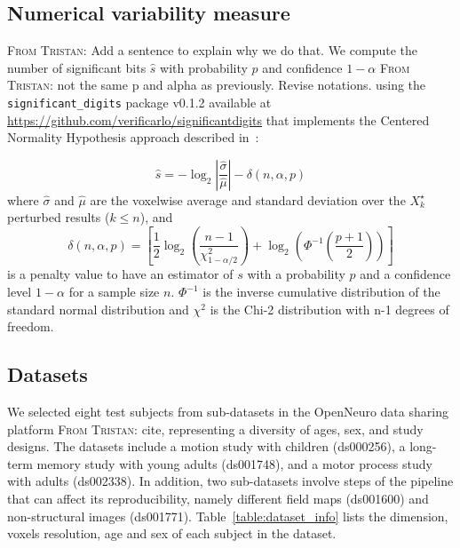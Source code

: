 \documentclass{article}
\newcommand{\TG}[1]{\color{blue}\textsc{From Tristan:} #1\color{black}\xspace}
\begin{document}


\subsection{Numerical variability measure}

\TG{Add a sentence to explain why we do that.} We compute the number of significant bits $\hat{s}$ with probability $p$ and confidence $1-\alpha$ \TG{not the same p and alpha as previously. Revise notations.} using the \texttt{significant\_digits} package v0.1.2 available at \url{https://github.com/verificarlo/significantdigits} that implements the Centered Normality Hypothesis approach described in~\cite{sohier2021confidence}:

\[
    \hat{s} = -\log_2 \left| \frac{\hat{\sigma}}{\hat{\mu}} \right| - \delta(n, \alpha, p)
\]
where $\hat{\sigma}$ and $\hat{\mu}$ are the voxelwise average and standard deviation over the $X_k^\star$ perturbed results ($k \leq n$), and
\[
    \delta(n, \alpha, p) =
    \left[
        \frac{1}{2} \log_2 \left( \frac{n-1}{\chi^2_{1-\alpha/2}} \right) +
        \log_2 \left( \Phi^{-1} \left( \frac{p+1}{2} \right) \right)
        \right]
\]
is a penalty value to have an estimator of $s$ with a probability $p$ and a confidence level $1-\alpha$ for a sample size $n$. $\Phi^{-1}$ is the inverse cumulative distribution of the standard normal distribution and $\chi^2$ is the Chi-2 distribution with n-1 degrees of freedom.

\subsection{Datasets}

We selected eight test subjects from sub-datasets in the OpenNeuro data sharing platform \TG{cite}, representing a diversity of ages, sex, and study designs. The datasets include a motion study with children (ds000256), a long-term memory study with young adults (ds001748), and a motor process study with adults (ds002338). In addition, two sub-datasets involve steps of the pipeline that can affect its reproducibility, namely different field maps (ds001600) and non-structural images (ds001771). Table~\ref{table:dataset_info} lists the dimension, voxels resolution, age and sex of each subject in the dataset.
\end{document}
